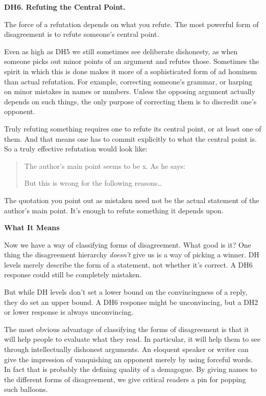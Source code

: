 \textbf{DH6. Refuting the Central Point.}

The force of a refutation depends on what you refute. The most powerful
form of disagreement is to refute someone's central point.

Even as high as DH5 we still sometimes see deliberate dishonesty, as
when someone picks out minor points of an argument and refutes those.
Sometimes the spirit in which this is done makes it more of a
sophisticated form of ad hominem than actual refutation. For example,
correcting someone's grammar, or harping on minor mistakes in names or
numbers. Unless the opposing argument actually depends on such things,
the only purpose of correcting them is to discredit one's opponent.

Truly refuting something requires one to refute its central point, or at
least one of them. And that means one has to commit explicitly to what
the central point is. So a truly effective refutation would look like:

\begin{quote}
The author's main point seems to be x. As he says:

\begin{quote}
\end{quote}

But this is wrong for the following reasons\ldots{}
\end{quote}

The quotation you point out as mistaken need not be the actual statement
of the author's main point. It's enough to refute something it depends
upon.

\textbf{What It Means}

Now we have a way of classifying forms of disagreement. What good is it?
One thing the disagreement hierarchy \emph{doesn't} give us is a way of
picking a winner. DH levels merely describe the form of a statement, not
whether it's correct. A DH6 response could still be completely mistaken.

But while DH levels don't set a lower bound on the convincingness of a
reply, they do set an upper bound. A DH6 response might be unconvincing,
but a DH2 or lower response is always unconvincing.

The most obvious advantage of classifying the forms of disagreement is
that it will help people to evaluate what they read. In particular, it
will help them to see through intellectually dishonest arguments. An
eloquent speaker or writer can give the impression of vanquishing an
opponent merely by using forceful words. In fact that is probably the
defining quality of a demagogue. By giving names to the different forms
of disagreement, we give critical readers a pin for popping such
balloons.

